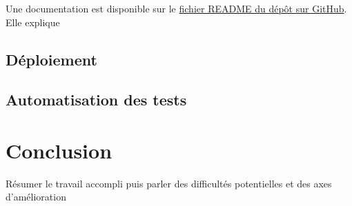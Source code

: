 \documentclass[french]{article}
\begin{document}
    Une documentation est disponible sur le \href{https://github.com/vinpap/adrenaline.ai/blob/main/README.md}{fichier README du dépôt sur GitHub}. Elle explique 
    \subsection{Déploiement}
    \subsection{Automatisation des tests}
  
    
    \newpage
    \section*{Conclusion}
    Résumer le travail accompli puis parler des difficultés potentielles et des axes d'amélioration
    
    


    
\end{document}
